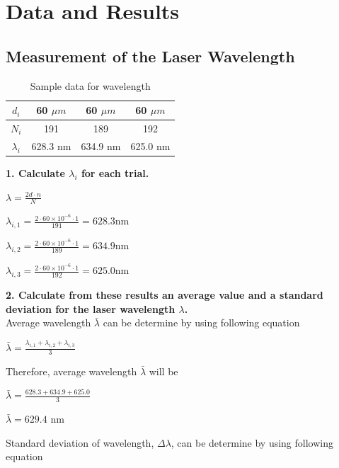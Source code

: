 \documentclass[a4paper,12pt]{report}
\begin{document}
\chapter{Data and Results}
\section{Measurement of the Laser Wavelength}
\begin{table}[h]
	\begin{center}
\begin{tabular}{|c|c|c|c|}
	\hline $d_{i}$ & 60 $\mu m $ & 60 $\mu m $ & 60 $\mu m $ \\ 
	\hline $N_{i}$ & 191 & 189 & 192 \\ 
	\hline $\lambda_{i}$ & 628.3 nm & 634.9 nm & 625.0 nm \\ 
	\hline 
\end{tabular} 
\end{center}
\caption{Sample data for wavelength} 
\end{table}
\textbf{1. Calculate $\lambda_{i}$ for each trial.}
\begin{center}
	{\Large $\lambda=\frac{2d\cdot n}{N}$}
\end{center}
\begin{center}
$\lambda_{i,1}=\frac{2\cdot60\times10^{-6}\cdot 1}{191}=628.3$nm
\end{center}
\begin{center}
	$\lambda_{i,2}=\frac{2\cdot60\times10^{-6}\cdot 1}{189}=634.9$nm
\end{center}
\begin{center}
$\lambda_{i,3}=\frac{2\cdot60\times10^{-6}\cdot 1}{192}=625.0$nm
\end{center}
\textbf{2. Calculate from these results an average value and a standard deviation for the laser wavelength $\lambda$.}\\
Average wavelength $\bar{\lambda}$ can be determine by using following equation
\begin{center}
{\Large 	$\bar{\lambda}=\frac{\lambda_{i,1}+\lambda_{i,2}+\lambda_{i,3}}{3}$}
\end{center}
Therefore, average wavelength $\bar{\lambda}$ will be
\begin{center}
	{\Large 	$\bar{\lambda}=\frac{628.3+634.9+625.0}{3}$}
\end{center}
\begin{center}
	{\Large 	$\bar{\lambda}=629.4$ nm}
\end{center}
Standard deviation of wavelength, $\Delta \lambda$, can be determine by using following equation
\end{document}
